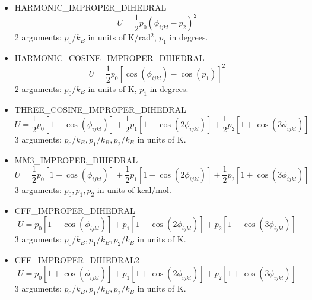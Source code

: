 \begin{itemize}
  \item{HARMONIC\_IMPROPER\_DIHEDRAL}\\
  \begin{equation}
  U=\frac{1}{2}p_0\left(\phi_{ijkl}-p_2\right)^2
  \end{equation}
  2 arguments: $p_0/k_B$ in units of K/rad$^2$, $p_1$ in degrees.

  \item{HARMONIC\_COSINE\_IMPROPER\_DIHEDRAL}\\
  \begin{equation}
  U=\frac{1}{2}p_0\left[\cos\left(\phi_{ijkl}\right)-\cos\left(p_1\right)\right]^2
  \end{equation}
  2 arguments: $p_0/k_B$ in units of K, $p_1$ in degrees.

  \item{THREE\_COSINE\_IMPROPER\_DIHEDRAL}\\
  \begin{equation}
  U=\frac{1}{2}p_0\left[1+\cos\left(\phi_{ijkl}\right)\right]+
    \frac{1}{2}p_1\left[1-\cos\left(2\phi_{ijkl}\right)\right]+
    \frac{1}{2}p_2\left[1+\cos\left(3\phi_{ijkl}\right)\right]
  \end{equation}
  3 arguments: $p_0/k_B,p_1/k_B,p_2/k_B$ in units of K.

  \item{MM3\_IMPROPER\_DIHEDRAL}\\
  \begin{equation}
  U=\frac{1}{2}p_0\left[1+\cos\left(\phi_{ijkl}\right)\right]+
    \frac{1}{2}p_1\left[1-\cos\left(2\phi_{ijkl}\right)\right]+
    \frac{1}{2}p_2\left[1+\cos\left(3\phi_{ijkl}\right)\right]
  \end{equation}
  3 arguments: $p_0,p_1,p_2$ in units of kcal/mol.


  \item{CFF\_IMPROPER\_DIHEDRAL}\\
  \begin{equation}
  U=p_0\left[1-\cos\left(\phi_{ijkl}\right)\right]+
    p_1\left[1-\cos\left(2\phi_{ijkl}\right)\right]+
    p_2\left[1-\cos\left(3\phi_{ijkl}\right)\right]
  \end{equation}
  3 arguments: $p_0/k_B,p_1/k_B,p_2/k_B$ in units of K.

  \item{CFF\_IMPROPER\_DIHEDRAL2}\\
  \begin{equation}
  U=p_0\left[1+\cos\left(\phi_{ijkl}\right)\right]+
    p_1\left[1+\cos\left(2\phi_{ijkl}\right)\right]+
    p_2\left[1+\cos\left(3\phi_{ijkl}\right)\right]
  \end{equation}
  3 arguments: $p_0/k_B,p_1/k_B,p_2/k_B$ in units of K.


\end{itemize}
